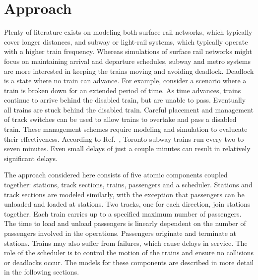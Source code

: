 \section{Approach}
Plenty of literature exists on modeling both surface rail networks, which typically cover longer distances, and subway or light-rail systems, which typically operate with a higher train frequency. Whereas simulations of surface rail networks might focus on maintaining arrival and departure schedules, subway and metro systems are more interested in keeping the trains moving and avoiding deadlock.  Deadlock is a state where no train can advance.  For example, consider a scenario where a train is broken down for an extended period of time.  As time advances, trains continue to arrive behind the disabled train, but are unable to pass.  Eventually all trains are stuck behind the disabled train.  Careful placement and management of track switches can be used to allow trains to overtake and pass a disabled train. These management schemes require modeling and simulation to evalueate their effectiveness.  According to Ref.~, Toronto subway trains run every two to seven minutes. Even small delays of just a couple minutes can result in relatively significant delays.

The approach considered here consists of five atomic components coupled together: stations, track sections, trains, passengers and a scheduler. Stations and track sections are modeled similarly, with the exception that passengers can be unloaded and loaded at stations. Two tracks, one for each direction, join stations together. Each train carries up to a specified maximum number of passengers. The time to load and unload passengers is linearly dependent on the number of passengers involved in the operations. Passengers originate and terminate at stations.  Trains may also suffer from failures, which cause delays in service.  The role of the scheduler is to control the motion of the trains and ensure no collisions or deadlocks occur.  The models for these components are described in more detail in the following sections.

